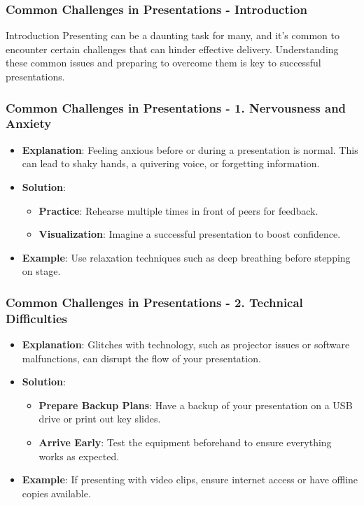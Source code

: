 \documentclass[aspectratio=169]{beamer}
\begin{document}
\begin{frame}[fragile]
    \frametitle{Common Challenges in Presentations - Introduction}
    \begin{block}{Introduction}
        Presenting can be a daunting task for many, and it's common to encounter certain challenges that can hinder effective delivery. Understanding these common issues and preparing to overcome them is key to successful presentations.
    \end{block}
\end{frame}

\begin{frame}[fragile]
    \frametitle{Common Challenges in Presentations - 1. Nervousness and Anxiety}
    \begin{itemize}
        \item \textbf{Explanation}: Feeling anxious before or during a presentation is normal. This can lead to shaky hands, a quivering voice, or forgetting information.
        \item \textbf{Solution}: 
        \begin{itemize}
            \item \textbf{Practice}: Rehearse multiple times in front of peers for feedback.
            \item \textbf{Visualization}: Imagine a successful presentation to boost confidence.
        \end{itemize}
        \item \textbf{Example}: Use relaxation techniques such as deep breathing before stepping on stage.
    \end{itemize}
\end{frame}

\begin{frame}[fragile]
    \frametitle{Common Challenges in Presentations - 2. Technical Difficulties}
    \begin{itemize}
        \item \textbf{Explanation}: Glitches with technology, such as projector issues or software malfunctions, can disrupt the flow of your presentation.
        \item \textbf{Solution}: 
        \begin{itemize}
            \item \textbf{Prepare Backup Plans}: Have a backup of your presentation on a USB drive or print out key slides.
            \item \textbf{Arrive Early}: Test the equipment beforehand to ensure everything works as expected.
        \end{itemize}
        \item \textbf{Example}: If presenting with video clips, ensure internet access or have offline copies available.
    \end{itemize}
\end{frame}
\end{document}
